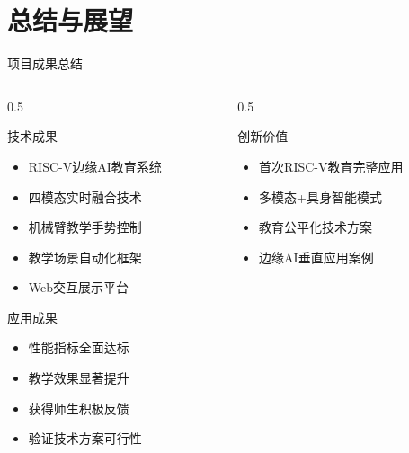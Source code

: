\documentclass[aspectratio=169,12pt]{beamer}
\begin{document}
\section{总结与展望}

\begin{frame}{项目成果总结}
    \begin{columns}
        \begin{column}{0.5\textwidth}
            \begin{block}{技术成果}
                \begin{itemize}
                    \item RISC-V边缘AI教育系统
                    \item 四模态实时融合技术
                    \item 机械臂教学手势控制
                    \item 教学场景自动化框架
                    \item Web交互展示平台
                \end{itemize}
            \end{block}
            
            \begin{block}{应用成果}
                \begin{itemize}
                    \item 性能指标全面达标
                    \item 教学效果显著提升
                    \item 获得师生积极反馈
                    \item 验证技术方案可行性
                \end{itemize}
            \end{block}
        \end{column}
        \begin{column}{0.5\textwidth}
            \begin{block}{创新价值}
                \begin{itemize}
                    \item 首次RISC-V教育完整应用
                    \item 多模态+具身智能模式  
                    \item 教育公平化技术方案
                    \item 边缘AI垂直应用案例
                \end{itemize}
            \end{block}
            

\end{column}
\end{columns}
\end{frame}
\end{document}
